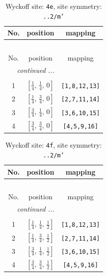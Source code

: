 \documentclass[fleqn,8pt]{jsarticle}
\begin{document}
\begin{longtable}{ccc}
\caption{Wyckoff site: {\tt 4e}, site symmetry: {\tt ..2/m'}}
 \\
 \hline \hline
No. & position & mapping \\ \hline \endfirsthead

\multicolumn{2}{l}{\tablename\ \thetable{}} \\
 \hline \hline
No. & position & mapping \\ \hline \endhead

 \hline \hline
\multicolumn{2}{r}{\footnotesize\it continued ...} \\ \endfoot

 \hline \hline
\multicolumn{2}{r}{} \\ \endlastfoot

1 & $\left[ \frac{1}{4},\, \frac{1}{4},\, 0 \right]$ & {\tt [1,8,12,13]} \\ \hline
2 & $\left[ \frac{1}{4},\, \frac{3}{4},\, 0 \right]$ & {\tt [2,7,11,14]} \\ \hline
3 & $\left[ \frac{3}{4},\, \frac{1}{4},\, 0 \right]$ & {\tt [3,6,10,15]} \\ \hline
4 & $\left[ \frac{3}{4},\, \frac{3}{4},\, 0 \right]$ & {\tt [4,5,9,16]} \\
\end{longtable}
\renewcommand{\arraystretch}{1.2}
\begin{longtable}{ccc}
\caption{Wyckoff site: {\tt 4f}, site symmetry: {\tt ..2/m'}}
 \\
 \hline \hline
No. & position & mapping \\ \hline \endfirsthead

\multicolumn{2}{l}{\tablename\ \thetable{}} \\
 \hline \hline
No. & position & mapping \\ \hline \endhead

 \hline \hline
\multicolumn{2}{r}{\footnotesize\it continued ...} \\ \endfoot

 \hline \hline
\multicolumn{2}{r}{} \\ \endlastfoot

1 & $\left[ \frac{1}{4},\, \frac{1}{4},\, \frac{1}{2} \right]$ & {\tt [1,8,12,13]} \\ \hline
2 & $\left[ \frac{1}{4},\, \frac{3}{4},\, \frac{1}{2} \right]$ & {\tt [2,7,11,14]} \\ \hline
3 & $\left[ \frac{3}{4},\, \frac{1}{4},\, \frac{1}{2} \right]$ & {\tt [3,6,10,15]} \\ \hline
4 & $\left[ \frac{3}{4},\, \frac{3}{4},\, \frac{1}{2} \right]$ & {\tt [4,5,9,16]} \\
\end{longtable}
\end{document}
